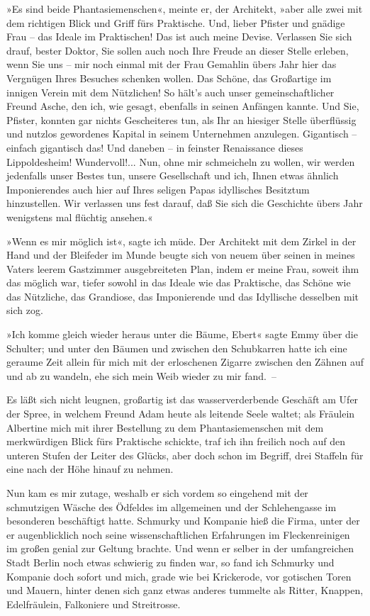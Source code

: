 »Es sind beide Phantasiemenschen«, meinte er, der Architekt, »aber
alle zwei mit dem richtigen Blick und Griff fürs Praktische. Und,
lieber Pfister und gnädige Frau – das Ideale im Praktischen! Das
ist auch meine Devise. Verlassen Sie sich drauf, bester Doktor, Sie
sollen auch noch Ihre Freude an dieser Stelle erleben, wenn Sie uns
– mir noch einmal mit der Frau Gemahlin übers Jahr hier das
Vergnügen Ihres Besuches schenken wollen. Das Schöne, das
Großartige im innigen Verein mit dem Nützlichen! So hält's auch
unser gemeinschaftlicher Freund Asche, den ich, wie gesagt,
ebenfalls in seinen Anfängen kannte. Und Sie, Pfister, konnten gar
nichts Gescheiteres tun, als Ihr an hiesiger Stelle überflüssig und
nutzlos gewordenes Kapital in seinem Unternehmen anzulegen.
Gigantisch – einfach gigantisch das! Und daneben – in feinster
Renaissance dieses Lippoldesheim! Wundervoll!... Nun, ohne mir
schmeicheln zu wollen, wir werden jedenfalls unser Bestes tun,
unsere Gesellschaft und ich, Ihnen etwas ähnlich Imponierendes auch
hier auf Ihres seligen Papas idyllisches Besitztum hinzustellen.
Wir verlassen uns fest darauf, daß Sie sich die Geschichte übers
Jahr wenigstens mal flüchtig ansehen.«

»Wenn es mir möglich ist«, sagte ich müde. Der Architekt mit dem
Zirkel in der Hand und der Bleifeder im Munde beugte sich von neuem
über seinen in meines Vaters leerem Gastzimmer ausgebreiteten Plan,
indem er meine Frau, soweit ihm das möglich war, tiefer sowohl in
das Ideale wie das Praktische, das Schöne wie das Nützliche, das
Grandiose, das Imponierende und das Idyllische desselben mit sich
zog.

»Ich komme gleich wieder heraus unter die Bäume, Ebert« sagte Emmy
über die Schulter; und unter den Bäumen und zwischen den
Schubkarren hatte ich eine geraume Zeit allein für mich mit der
erloschenen Zigarre zwischen den Zähnen auf und ab zu wandeln, ehe
sich mein Weib wieder zu mir fand.~–

Es läßt sich nicht leugnen, großartig ist das wasserverderbende
Geschäft am Ufer der Spree, in welchem Freund Adam heute als
leitende Seele waltet; als Fräulein Albertine mich mit ihrer
Bestellung zu dem Phantasiemenschen mit dem merkwürdigen Blick fürs
Praktische schickte, traf ich ihn freilich noch auf den unteren
Stufen der Leiter des Glücks, aber doch schon im Begriff, drei
Staffeln für eine nach der Höhe hinauf zu nehmen.

Nun kam es mir zutage, weshalb er sich vordem so eingehend mit der
schmutzigen Wäsche des Ödfeldes im allgemeinen und der
Schlehengasse im besonderen beschäftigt hatte. Schmurky und
Kompanie hieß die Firma, unter der er augenblicklich noch seine
wissenschaftlichen Erfahrungen im Fleckenreinigen im großen genial
zur Geltung brachte. Und wenn er selber in der umfangreichen Stadt
Berlin noch etwas schwierig zu finden war, so fand ich Schmurky und
Kompanie doch sofort und mich, grade wie bei Krickerode, vor
gotischen Toren und Mauern, hinter denen sich ganz etwas anderes
tummelte als Ritter, Knappen, Edelfräulein, Falkoniere und
Streitrosse.

